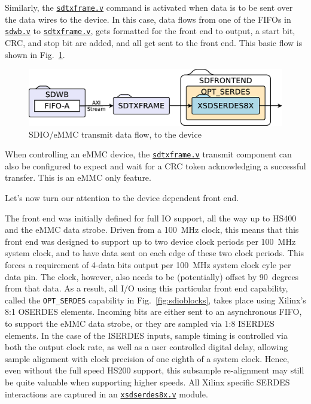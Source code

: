 \documentclass{gqtekspec}
\newcommand{\zhref}[2]{\href{#1}{\textcolor{dkblue}{#2}}}
\begin{document}
Similarly, the \zhref{../rtl/sdtxframe.v}{\tt sdtxframe.v} command is activated when data is to be
sent over the data wires to the device.  In this case, data flows from one
of the FIFOs in \zhref{../rtl/sdwb.v}{\tt sdwb.v} to \zhref{../rtl/sdtxframe.v}{\tt sdtxframe.v}, gets formatted for the
front end to output, a start bit, CRC, and stop bit are added, and all get
sent to the front end.  This basic flow is shown in Fig.~\ref{fig:sdiotxflow}.
\begin{figure}\begin{center}
\includegraphics[width=5.0in]{gfx/sdiotxflow.eps}
\caption{SDIO/eMMC transmit data flow, to the device}\label{fig:sdiotxflow}
\end{center}\end{figure}
When controlling an eMMC device, the
\zhref{../rtl/sdtxframe.v}{\tt sdtxframe.v} transmit component can also be
configured to expect and wait for a CRC token acknowledging a successful
transfer.  This is an eMMC only feature.

Let's now turn our attention to the device dependent front end.

The front end was initially defined for full IO support, all the way up to
HS400 and the eMMC data strobe.  Driven from a 100~MHz clock, this means that
this front end was designed to support up to two device clock periods per
100~MHz system clock, and to have data sent on each edge of these two clock
periods.  This forces a requirement of 4-data bits output per 100~MHz system
clock cyle per data pin.
The clock, however, also needs to be (potentially) offset by 90~degrees from
that data.  As a result, all I/O using this particular front end capability,
called the {\tt OPT\_SERDES} capability in Fig.~\ref{fig:sdioblocks}, takes
place using Xilinx's 8:1 OSERDES elements.  Incoming bits are either sent
to an asynchronous FIFO, to support the eMMC data strobe, or they are
sampled via 1:8 ISERDES elements.  In the case of the ISERDES inputs, sample
timing is controlled via both the output clock rate, as well as a user
controlled digital delay, allowing sample alignment with clock precision
of one eighth of a system clock.  Hence, even without the full speed HS200
support, this subsample re-alignment may still be quite valuable when supporting
higher speeds.  All Xilinx specific SERDES interactions are captured in an
\zhref{../rtl/xsdserdes8x.v}{\tt xsdserdes8x.v} module.
\end{document}
